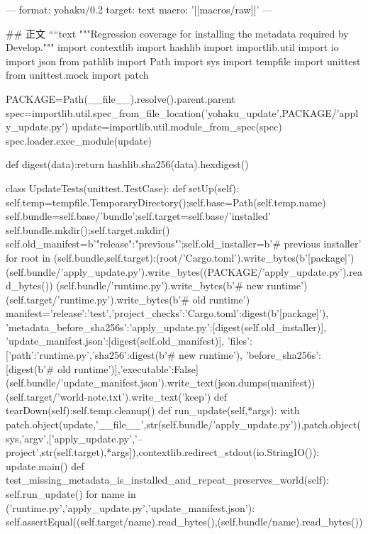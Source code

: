 ---
format: yohaku/0.2
target: text
macro: '[[macros/raw]]'
---

## 正文
````text
"""Regression coverage for installing the metadata required by Develop."""
import contextlib
import hashlib
import importlib.util
import io
import json
from pathlib import Path
import sys
import tempfile
import unittest
from unittest.mock import patch

PACKAGE=Path(__file__).resolve().parent.parent
spec=importlib.util.spec_from_file_location('yohaku_update',PACKAGE/'apply_update.py')
update=importlib.util.module_from_spec(spec)
spec.loader.exec_module(update)

def digest(data):return hashlib.sha256(data).hexdigest()

class UpdateTests(unittest.TestCase):
    def setUp(self):
        self.temp=tempfile.TemporaryDirectory();self.base=Path(self.temp.name)
        self.bundle=self.base/'bundle';self.target=self.base/'installed'
        self.bundle.mkdir();self.target.mkdir()
        self.old_manifest=b'{"release":"previous"}\n';self.old_installer=b'# previous installer\n'
        for root in (self.bundle,self.target):(root/'Cargo.toml').write_bytes(b'[package]\n')
        (self.bundle/'apply_update.py').write_bytes((PACKAGE/'apply_update.py').read_bytes())
        (self.bundle/'runtime.py').write_bytes(b'# new runtime\n')
        (self.target/'runtime.py').write_bytes(b'# old runtime\n')
        manifest={'release':'test','project_checks':{'Cargo.toml':digest(b'[package]\n')},
                  'metadata_before_sha256s':{'apply_update.py':[digest(self.old_installer)],
                                            'update_manifest.json':[digest(self.old_manifest)]},
                  'files':[{'path':'runtime.py','sha256':digest(b'# new runtime\n'),
                            'before_sha256s':[digest(b'# old runtime\n')],'executable':False}]}
        (self.bundle/'update_manifest.json').write_text(json.dumps(manifest))
        (self.target/'world-note.txt').write_text('keep')
    def tearDown(self):self.temp.cleanup()
    def run_update(self,*args):
        with patch.object(update,'__file__',str(self.bundle/'apply_update.py')),patch.object(sys,'argv',['apply_update.py','--project',str(self.target),*args]),contextlib.redirect_stdout(io.StringIO()):
            update.main()
    def test_missing_metadata_is_installed_and_repeat_preserves_world(self):
        self.run_update()
        for name in ('runtime.py','apply_update.py','update_manifest.json'):
            self.assertEqual((self.target/name).read_bytes(),(self.bundle/name).read_bytes())
